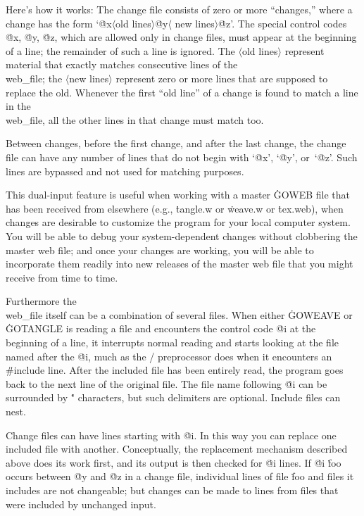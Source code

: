 \more Here's how it works: The change file consists of zero or more ``changes,''
where a change has the form `\.{@x}$\langle$old lines$\rangle$\.{@y}$\langle$%
new lines$\rangle$\.{@z}'. The special control codes \.{@x}, \.{@y}, \.{@z},
which are allowed only in change files, must appear at the beginning of a line;
the remainder of such a line is ignored.
The $\langle$old lines$\rangle$ represent material that exactly matches
consecutive lines of the \\{web\_file}; the $\langle$new lines$\rangle$
represent zero or more lines that are supposed to replace the old. Whenever
the first ``old line'' of a change is found to match a line in the
\\{web\_file}, all the other lines in that change must match too.

\more Between changes, before the first change, and after the last change,
the change file can have any number of lines that do not begin with
`\.{@x}', `\.{@y}', or~`\.{@z}'. Such lines are bypassed and not used for
matching purposes.

\more This dual-input feature is useful when working with a master \.{GOWEB}
file that has been received from elsewhere (e.g., \.{tangle.w} or
\.{weave.w} or \.{tex.web}), when changes are desirable to customize the
program for your local computer system. You will be able to debug your
system-dependent changes without clobbering the master web file; and once
your changes are working, you will be able to incorporate them readily
into new releases of the master web file that you might receive from time
to time.

Furthermore the \\{web\_file} itself can be a combination of
several files.  When either \.{GOWEAVE} or \.{GOTANGLE} is reading a file and
encounters the control code \.{@i} at the beginning of a line, it
interrupts normal reading and starts looking at the file named after the
\.{@i}, much as the \GO/ preprocessor does when it encounters an \.{\#include}
line.  After the included file has been entirely read, the program
goes back to the next line
of the original file.  The file name following \.{@i} can be
surrounded by \." characters, but such delimiters are
optional. Include files can nest.

\more
Change files can have lines starting with \.{@i}. In this way
you can replace one included file with another. Conceptually, the
replacement mechanism described above does its work first, and
its output is then checked for \.{@i} lines. If \.{@i} \.{foo}
occurs between \.{@y} and \.{@z} in a change file, individual lines
of file \.{foo} and files it includes are not changeable; but changes
can be made to lines from files that were included by unchanged input.

